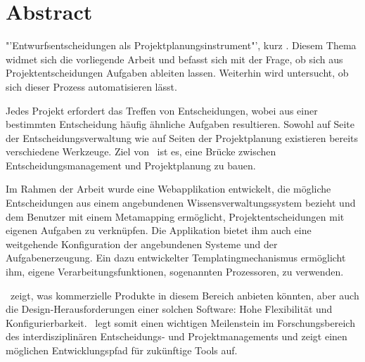 \chapter{Abstract}
	

	"'Entwurfsentscheidungen als Projektplanungsinstrument"', kurz \eeppi . 
	Diesem Thema widmet sich die vorliegende Arbeit und befasst sich mit der Frage, 
	ob sich aus Projektentscheidungen Aufgaben ableiten lassen. 
	Weiterhin wird untersucht, ob sich dieser Prozess automatisieren lässt. 

	Jedes Projekt erfordert das Treffen von Entscheidungen, 
	wobei aus einer bestimmten Entscheidung häufig ähnliche Aufgaben resultieren. 
	Sowohl auf Seite der Entscheidungsverwaltung wie auf Seiten der Projektplanung existieren bereits verschiedene Werkzeuge. 
	Ziel von \eeppi\ ist es, eine Brücke zwischen Entscheidungsmanagement und Projektplanung zu bauen.

	Im Rahmen der Arbeit wurde eine Webapplikation entwickelt, 
	die mögliche Entscheidungen aus einem angebundenen Wissensverwaltungssystem bezieht 
	und dem Benutzer mit einem Metamapping ermöglicht,
	Projektentscheidungen mit eigenen Aufgaben zu verknüpfen. 
	Die Applikation bietet ihm auch eine weitgehende Konfiguration der angebundenen Systeme und der Aufgabenerzeugung. 
	Ein dazu entwickelter Templatingmechanismus ermöglicht ihm, eigene Verarbeitungsfunktionen, sogenannten Prozessoren, zu verwenden. 

	\eeppi\ zeigt, was kommerzielle Produkte in diesem Bereich anbieten könnten, 
	aber auch die Design-Herausforderungen einer solchen Software: 
	Hohe Flexibilität und Konfigurierbarkeit. 
	\eeppi\ legt somit einen wichtigen Meilenstein im Forschungsbereich des interdisziplinären Entscheidungs- und Projektmanagements 
	und zeigt einen möglichen Entwicklungspfad für zukünftige Tools auf.
